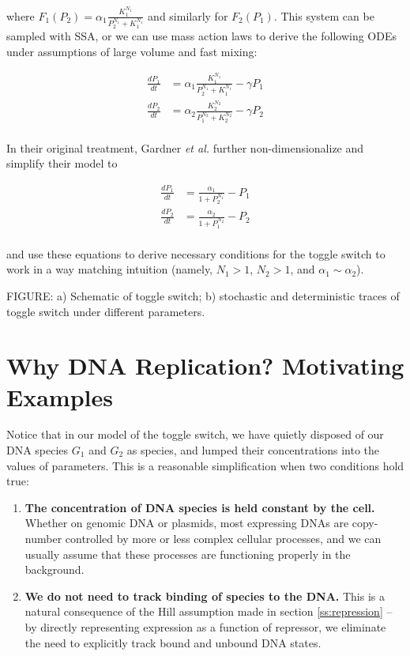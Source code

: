 \documentclass[preprint,12pt]{elsarticle}
\begin{document}
where $F_1(P_2) = \alpha_1\frac{K_1^{N_1}}{P_2^{N_1} + K_1^{N_1}}$ and similarly for $F_2(P_1)$. This system can be sampled with SSA, or we can use mass action laws to derive the following ODEs under assumptions of large volume and fast mixing:

\begin{align}
	\frac{dP_1}{dt} &= \alpha_1\frac{K_1^{N_1}}{P_2^{N_1} + K_1^{N_1}} - \gamma P_1\\
	\frac{dP_2}{dt} &= \alpha_2\frac{K_2^{N_2}}{P_1^{N_2} + K_2^{N_2}} - \gamma P_2\\
\end{align}

In their original treatment, Gardner \emph{et al.} further non-dimensionalize and simplify their model to 

\begin{align}
	\frac{dP_1}{dt} &= \frac{\alpha_1}{1 + P_2^{N_1}} - P_1\\
	\frac{dP_2}{dt} &= \frac{\alpha_2}{1 + P_1^{N_2}} - P_2\\	
\end{align}

and use these equations to derive necessary conditions for the toggle switch to work in a way matching intuition (namely, $N_1 > 1$, $N_2 > 1$, and $\alpha_1 \sim \alpha_2$). 

\vspace{.5in}
FIGURE: a) Schematic of toggle switch; b) stochastic and deterministic traces of toggle switch under different parameters.
\vspace{.5in}

\section{Why DNA Replication? Motivating Examples}\label{S:motivation}

Notice that in our model of the toggle switch, we have quietly disposed of our DNA species $G_1$ and $G_2$ as species, and lumped their concentrations into the values of parameters. This is a reasonable simplification when two conditions hold true:

\begin{enumerate}
	\item \textbf{The concentration of DNA species is held constant by the cell.} Whether on genomic DNA or plasmids, most expressing DNAs are copy-number controlled by more or less complex cellular processes, and we can usually assume that these processes are functioning properly in the background.
	\item \textbf{We do not need to track binding of species to the DNA.} This is a natural consequence of the Hill assumption made in section \ref{ss:repression} -- by directly representing expression as a function of repressor, we eliminate the need to explicitly track bound and unbound DNA states. 
\end{enumerate}
\end{document}
